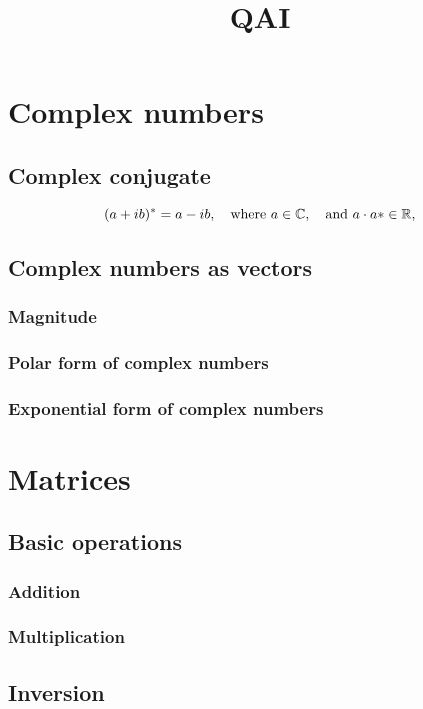 \documentclass{article}
\title{QAI}
\author{}
\date{}
\begin{document}
\maketitle
\tableofcontents
\section{Complex numbers}
\subsection{Complex conjugate}
\begin{equation}
    (a + ib)^* = a - ib, \\
    \quad \text{where } a \in \mathbb{C}, 
    \quad \text{and } a\cdot a* \in \mathbb{R},
\end{equation}


\subsection{Complex numbers as vectors}
\subsubsection{Magnitude}
\subsubsection{Polar form of complex numbers}
\subsubsection{Exponential form of complex numbers}

\section{Matrices}
\subsection{Basic operations}
\subsubsection{Addition}
\subsubsection{Multiplication}
\subsection{Inversion}
\end{document}
